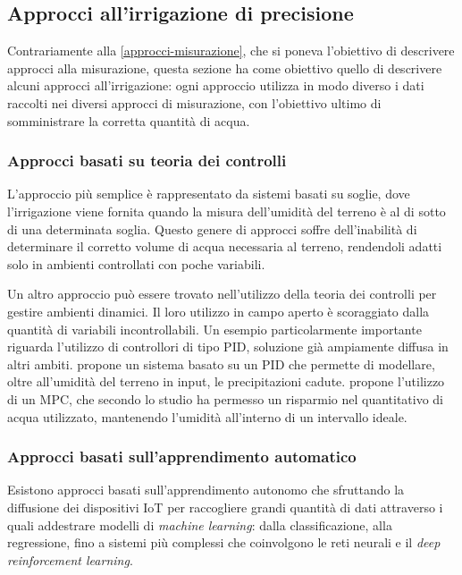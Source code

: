 \documentclass[12pt,a4paper,openright,twoside, openany]{book}
\begin{document}
\subsection{Approcci all'irrigazione di precisione}

Contrariamente alla \cref{approcci-misurazione}, che si poneva l'obiettivo di descrivere approcci alla misurazione, questa sezione ha come obiettivo quello di descrivere alcuni approcci all'irrigazione: ogni approccio utilizza in modo diverso i dati raccolti nei diversi approcci di misurazione, con l'obiettivo ultimo di somministrare la corretta quantità di acqua.

\subsubsection{Approcci basati su teoria dei controlli}

L'approccio più semplice è rappresentato da sistemi basati su soglie, dove l'irrigazione viene fornita quando la misura dell'umidità del terreno è al di sotto di una determinata soglia.
Questo genere di approcci soffre dell'inabilità di determinare il corretto volume di acqua necessaria al terreno, rendendoli adatti solo in ambienti controllati con poche variabili\cite{Zhao2023}.

Un altro approccio può essere trovato nell'utilizzo della teoria dei controlli per gestire ambienti dinamici. Il loro utilizzo in campo aperto è scoraggiato dalla quantità di variabili incontrollabili.
Un esempio particolarmente importante riguarda l'utilizzo di controllori di tipo \ac{PID}, soluzione già ampiamente diffusa in altri ambiti\cite{Astrom1995}.
\cite{Goodchild2015} propone un sistema basato su un PID che permette di modellare, oltre all'umidità del terreno in input, le precipitazioni cadute. \cite{Lozoya2016} propone l'utilizzo di un \ac{MPC}, che secondo lo studio ha permesso un risparmio nel quantitativo di acqua utilizzato, mantenendo l'umidità all'interno di un intervallo ideale.

\subsubsection{Approcci basati sull'apprendimento automatico}

Esistono approcci basati sull'apprendimento autonomo che sfruttando la diffusione dei dispositivi IoT per raccogliere grandi quantità di dati attraverso i quali addestrare modelli di \textit{machine learning}: dalla classificazione\cite{Gloria2021}, alla regressione\cite{Navarro2016}, fino a sistemi più complessi che coinvolgono le reti neurali\cite{Gong2022} e il \textit{deep reinforcement learning}\cite{Chen2021}.
\end{document}
